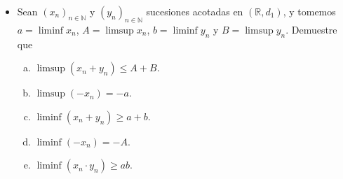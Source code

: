 \begin{itemize}[leftmargin=*]
\begin{enumerate}[a)]
\begin{proof}
            Ahora, note que dados $x,y \in \left[0,\dfrac{1}{2}\right]$, tenemos que
            \begin{align*}
                d_1(f(x),f(y))=\left|\frac{1}{2+x}-\frac{1}{2+y}\right|=\left|\frac{y-x}{(2+x)(2+y)}\right|.
            \end{align*}
            Por lo que probamos antes, $f(x)=\dfrac{1}{2+x}\leq \dfrac{1}{2}$, y lo mismo sucede con $f(y)=\dfrac{1}{2+y}$, entonces
            \begin{align*}
                d_1(f(x),f(y))=\left|\frac{y-x}{(2+x)(2+y)}\right|\leq \frac{1}{4}|x-y|=\frac{1}{4}d_1(x,y).
            \end{align*}
            En resumen
            \begin{align*}
                f: \left(\left[0,\dfrac{1}{2}\right],d_1\right) \longrightarrow \left(\left[0,\dfrac{1}{2}\right],d_1\right)\\
            \end{align*}
            es tal que $d_1(f(x),f(y))\leq \dfrac{1}{4}d_1(x,y)$ para todo $x,y \in \left[0,\dfrac{1}{2}\right]$, es decir, dado que $\dfrac{1}{4} \in (0,1)$, $f$ es una contracción en $\left(\left[0,\dfrac{1}{2}\right],d_1\right)$. Por el tercer ejercicio de la \textbf{Sección 1.4.1}, tenemos que la sucesión $a_{n+1}=f(a_n)$ es de Cauchy. Además, como $\left[0,\dfrac{1}{2}\right]$ es compacto, entonces $\left(\left[0,\dfrac{1}{2}\right],d_1\right)$ es completo y por tanto, la sucesión $(a_n)$ converge.
        \end{proof}
    \end{enumerate}
    \item Sean $(x_n)_{n \in \mathbb{N}}$ y $(y_n)_{n \in \mathbb{N}}$ sucesiones acotadas en $(\mathbb{R},d_1)$, y tomemos $a=\liminf x_n$, $A=\limsup x_n$, $b=\liminf y_n$ y $B=\limsup y_n$. Demuestre que 
    \begin{enumerate}[a)]
        \item $\limsup (x_n +y_n)\leq A+B$.
        \item $\limsup(-x_n)=-a$.
        \item $\liminf (x_n+y_n)\geq a+b$.
        \item $\liminf(-x_n)=-A$.
        \item $\liminf(x_n \cdot y_n)\geq ab$.
    \end{enumerate}
    

\end{itemize}
